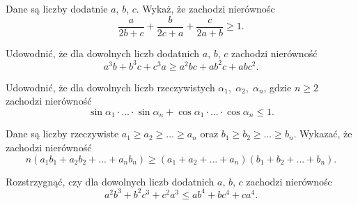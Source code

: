 \newpage

\begin{problem}{1}
	Dane są liczby dodatnie $a$, $b$, $c$. Wykaż, że zachodzi nierównośc
	\[
		\frac{a}{2b + c} + \frac{b}{2c + a} + \frac{c}{2a + b} \geqslant 1. 
	\]
\end{problem}

\begin{problem}{2}
	Udowodnić, że dla dowolnych liczb dodatnich $a$, $b$, $c$ zachodzi nierówność
	\[
		a^3b + b^3c + c^3a \geqslant a^2bc + ab^2c + abc^2.
	\]
\end{problem}

\begin{problem}{3}
	Udowodnić, że dla dowolnych liczb rzeczywistych $\alpha_1, \; \alpha_2, \; \alpha_n$, gdzie $n \geqslant 2$ zachodzi nierówność
	\[
		\sin{\alpha_1}\cdot ... \cdot \sin{\alpha_n} + \cos{\alpha_1}\cdot ... \cdot \cos{\alpha_n} \leqslant 1.
	\]
\end{problem}

\begin{problem}{4}
	Dane są liczby rzeczywiste $a_1 \geqslant a_2 \geqslant ... \geqslant a_n$ oraz $b_1 \geqslant b_2 \geqslant ... \geqslant b_n$. Wykazać, że zachodzi nierówność
	\[
		n(a_1b_1 + a_2b_2 + ... + a_nb_n) \geqslant (a_1 + a_2 + ... + a_n)(b_1 + b_2 + ... + b_n).
	\]
\end{problem}

\begin{problem}{5}
	Rozstrzygnąć, czy dla dowolnych liczb dodatnich $a$, $b$, $c$ zachodzi nierównośc
	\[
		a^2b^3 + b^2c^3 + c^2a^3 \leqslant ab^4 + bc^4 + ca^4.
	\]
\end{problem}
